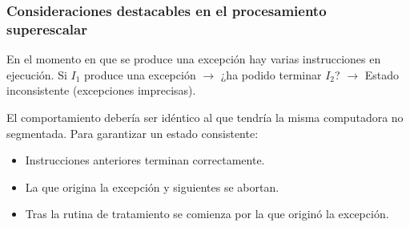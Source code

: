 \subsubsection*{Consideraciones destacables en el procesamiento superescalar}

En el momento en que se produce una excepción hay varias instrucciones en ejecución. Si $I_1$ produce una excepción $\to$ ¿ha podido terminar $I_2$? $\to$ Estado inconsistente (excepciones imprecisas).

El comportamiento debería ser idéntico al que tendría la misma computadora no segmentada. Para garantizar un estado consistente:

\begin{itemize}
  \item Instrucciones anteriores terminan correctamente.
  \item La que origina la excepción y siguientes se abortan.
  \item Tras la rutina de tratamiento se comienza por la que originó la excepción.
\end{itemize}